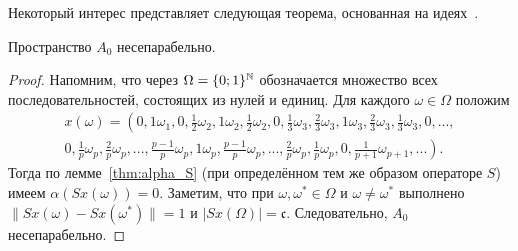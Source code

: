 Некоторый интерес представляет следующая теорема,
основанная на идеях~\cite{usachev2009_phd_vsu}.

\begin{theorem}
	Пространство $A_0$ несепарабельно.
\end{theorem}

\begin{proof}
	Напомним, что через $\Omega = \{0;1\}^{\mathbb{N}}$
	обозначается множество всех последовательностей, состоящих из нулей и единиц.
	Для каждого $\omega\in\Omega$ положим
	\begin{multline}
		\label{eq:x_omega_alpha_c}
		x(\omega)=\left(
			0, 1\omega_1,
			0, \frac{1}{2}\omega_2, 1\omega_2, \frac{1}{2}\omega_2,
			0, \frac{1}{3}\omega_3, \frac{2}{3}\omega_3, 1\omega_3, \frac{2}{3}\omega_3, \frac{1}{3}\omega_3,
			0, ...,
		\right. \\ \left.
			0, \frac{1}{p}\omega_p, \frac{2}{p}\omega_p, ..., \frac{p-1}{p}\omega_p, 1\omega_p,
				\frac{p-1}{p}\omega_p, ..., \frac{2}{p}\omega_p, \frac{1}{p}\omega_p,
			0, \frac{1}{p+1}\omega_{p+1}, ...
		\right).
	\end{multline}
	Тогда по лемме~\ref{thm:alpha_S} (при определённом тем же образом операторе $S$) имеем
	$\alpha(Sx(\omega)) = 0$.
	Заметим, что при $\omega,\omega^* \in \Omega$ и $\omega\neq\omega^*$ выполнено
	$\|Sx(\omega)-Sx(\omega^*)\|=1$ и $|Sx(\Omega)|=\mathfrak{c}$.
	Следовательно, $A_0$ несепарабельно.
\end{proof}


